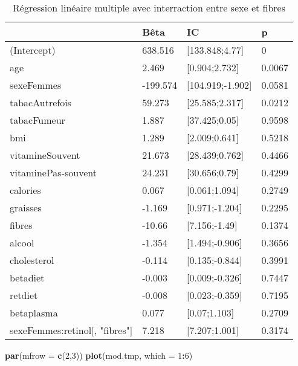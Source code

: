 \documentclass[]{article}
\newenvironment{Shaded}{\begin{snugshade}}{\end{snugshade}}
\newcommand{\KeywordTok}[1]{\textcolor[rgb]{0.13,0.29,0.53}{\textbf{#1}}}
\newcommand{\DataTypeTok}[1]{\textcolor[rgb]{0.13,0.29,0.53}{#1}}
\newcommand{\DecValTok}[1]{\textcolor[rgb]{0.00,0.00,0.81}{#1}}
\newcommand{\OperatorTok}[1]{\textcolor[rgb]{0.81,0.36,0.00}{\textbf{#1}}}
\newcommand{\NormalTok}[1]{#1}
\begin{document}
\begin{table}

\caption{\label{tab:unnamed-chunk-65}Régression linéaire multiple avec interraction entre sexe et fibres}
\centering
\begin{tabular}[t]{l|l|l|l}
\hline
  & Bêta & IC & p\\
\hline
\rowcolor[HTML]{BBD2E1}  (Intercept) & 638.516 & [133.848;4.77] & 0\\
\hline
age & 2.469 & [0.904;2.732] & 0.0067\\
\hline
\rowcolor[HTML]{BBD2E1}  sexeFemmes & -199.574 & [104.919;-1.902] & 0.0581\\
\hline
tabacAutrefois & 59.273 & [25.585;2.317] & 0.0212\\
\hline
\rowcolor[HTML]{BBD2E1}  tabacFumeur & 1.887 & [37.425;0.05] & 0.9598\\
\hline
bmi & 1.289 & [2.009;0.641] & 0.5218\\
\hline
\rowcolor[HTML]{BBD2E1}  vitamineSouvent & 21.673 & [28.439;0.762] & 0.4466\\
\hline
vitaminePas-souvent & 24.231 & [30.656;0.79] & 0.4299\\
\hline
\rowcolor[HTML]{BBD2E1}  calories & 0.067 & [0.061;1.094] & 0.2749\\
\hline
graisses & -1.169 & [0.971;-1.204] & 0.2295\\
\hline
\rowcolor[HTML]{BBD2E1}  fibres & -10.66 & [7.156;-1.49] & 0.1374\\
\hline
alcool & -1.354 & [1.494;-0.906] & 0.3656\\
\hline
\rowcolor[HTML]{BBD2E1}  cholesterol & -0.114 & [0.135;-0.844] & 0.3991\\
\hline
betadiet & -0.003 & [0.009;-0.326] & 0.7447\\
\hline
\rowcolor[HTML]{BBD2E1}  retdiet & -0.008 & [0.023;-0.359] & 0.7195\\
\hline
betaplasma & 0.077 & [0.07;1.103] & 0.2709\\
\hline
\rowcolor[HTML]{BBD2E1}  sexeFemmes:retinol[, "fibres"] & 7.218 & [7.207;1.001] & 0.3174\\
\hline
\end{tabular}
\end{table}

\begin{Shaded}
\begin{Highlighting}[]
\KeywordTok{par}\NormalTok{(}\DataTypeTok{mfrow =} \KeywordTok{c}\NormalTok{(}\DecValTok{2}\NormalTok{,}\DecValTok{3}\NormalTok{))}
\KeywordTok{plot}\NormalTok{(mod.tmp, }\DataTypeTok{which =} \DecValTok{1}\OperatorTok{:}\DecValTok{6}\NormalTok{)}
\end{Highlighting}
\end{Shaded}
\end{document}
